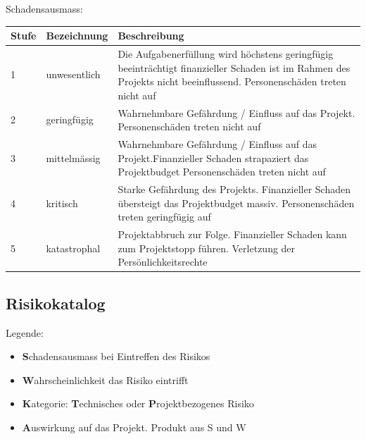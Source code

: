 \documentclass[a4paper]{report}
\begin{document}
\vspace{1em}
\noindent
Schadensausmass:

\vspace{1em}
\noindent
\begin{tabular}{|p{}|p{}|p{}|}
	\hline
	\textbf{Stufe} & \textbf{Bezeichnung} & \textbf{Beschreibung} \\
	\hline
	1 & unwesentlich & Die Aufgabenerfüllung wird höchstens geringfügig beeinträchtigt finanzieller Schaden ist im Rahmen des Projekts nicht beeinflussend. Personenschäden treten nicht auf \\
	\hline
	2 & geringfügig & Wahrnehmbare Gefährdung / Einfluss auf das Projekt. Personenschäden treten nicht auf \\
	\hline
	3 & mittelmässig & Wahrnehmbare Gefährdung / Einfluss auf das Projekt.Finanzieller Schaden strapaziert das Projektbudget
	Personenschäden treten nicht auf \\
	\hline
	4 & kritisch & Starke Gefährdung des Projekts. Finanzieller Schaden übersteigt das Projektbudget massiv. Personenschäden treten geringfügig auf \\
	\hline
	5 & katastrophal & Projektabbruch zur Folge. Finanzieller Schaden kann zum Projektstopp führen. Verletzung der Persönlichkeitsrechte
	\\
	\hline
\end{tabular}


\subsection{Risikokatalog}
\label{sec:Risikokatalog}
Legende:
\begin{itemize}
	\item \textbf{S}chadensausmass bei Eintreffen des Risikos
	\item \textbf{W}ahrscheinlichkeit das Risiko eintrifft
	\item \textbf{K}ategorie: \textbf{T}echnisches oder \textbf{P}rojektbezogenes Risiko
	\item \textbf{A}uswirkung auf das Projekt. Produkt aus S und W
\end{itemize}
\end{document}
